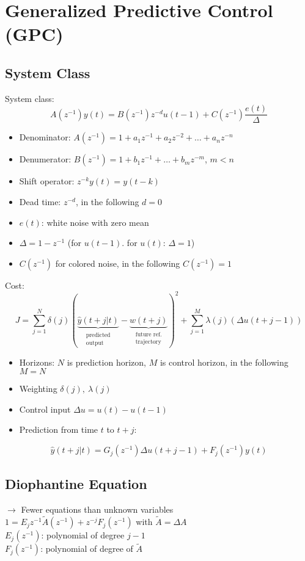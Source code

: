 \documentclass[english]{latex4ei/latex4ei_sheet}
\begin{document}
\section{Generalized Predictive Control (GPC)}
\begin{sectionbox}

\subsection{System Class}
System class:\\ 
$$A\left(z^{-1}\right) y(t)=B\left(z^{-1}\right) z^{-d} u(t-1)+C\left(z^{-1}\right) \frac{e(t)}{\Delta}$$
\begin{itemize}
    \item Denominator: $A\left(z^{-1}\right)=1+a_{1} z^{-1}+a_{2} z^{-2}+\ldots+a_{n} z^{-n}$
    \item Denumerator: $B\left(z^{-1}\right)=1+b_{1} z^{-1}+\ldots+b_{m} z^{-m}$, $m<n$
    \item Shift operator: $z^{-k} y(t)=y(t-k)$
    \item Dead time: $z^{-d}$, in the following $d=0$
    \item $e(t)$: white noise with zero mean
    \item $\Delta=1-z^{-1}$ (for $u(t-1)$. for $u(t)$: $\Delta=1$)
    \item $C\left(z^{-1}\right)$ for colored noise, in the following $C\left(z^{-1}\right)=1$
\end{itemize}
Cost: 
$$J=\sum_{j=1}^{N} \delta(j)(\underbrace{\hat{y}(t+j | t)}_{\substack{\text{predicted} \\ \text{output}}}-\underbrace{w(t+j)}_{\substack{\text{future ref.} \\ \text{trajectory}}})^{2}+\sum_{j=1}^{M} \lambda(j)(\Delta u(t+j-1))
$$
\begin{itemize}
    \item Horizons: $N$ is prediction horizon, $M$ is control horizon, in the following $M=N$
    \item Weighting $\delta(j),\ \lambda(j)$
    \item Control input $\Delta u = u(t)-u(t-1)$
    \item Prediction from time $t$ to $t+j$:
\end{itemize}
$$\hat{y}(t+j | t)=G_{j}(z^{-1})\Delta u(t+j-1)+F_{j}(z^{-1})y(t)
$$

\subsection{Diophantine Equation}
$\rightarrow$ Fewer equations than unknown variables\\
$1=E_{j} z^{-1} \tilde{A}\left(z^{-1}\right)+z^{-j} F_{j}\left(z^{-1}\right)$ with $\tilde{A}=\Delta A$ \\ $E_{j}\left(z^{-1}\right)$: polynomial of degree $j-1$ \\ $F_{j}\left(z^{-1}\right)$: polynomial of degree of $\tilde{A}$
\\ \\


\end{sectionbox}
\end{document}
